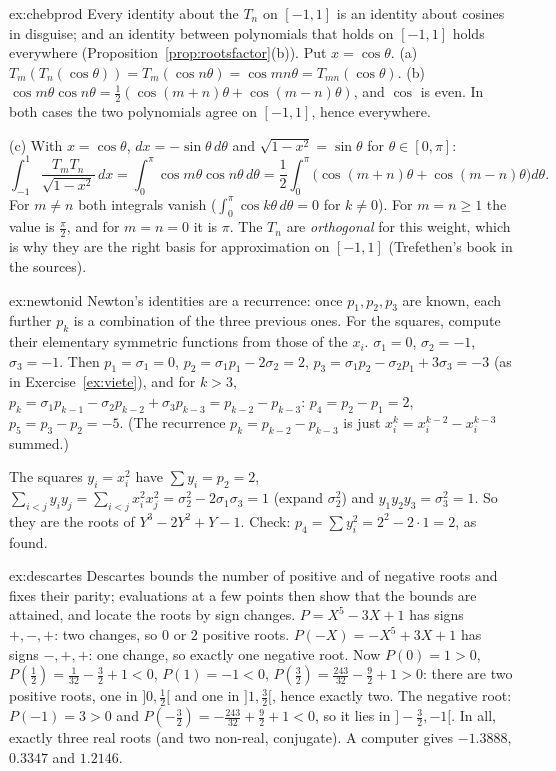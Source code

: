 \begin{solution}{ex:chebprod}
\idea Every identity about the $T_n$ on $[-1,1]$ is an identity about cosines in disguise; and an identity between polynomials that holds on $[-1,1]$ holds everywhere (Proposition~\ref{prop:rootsfactor}(b)).
\writeup Put $x=\cos\theta$. (a) $T_m(T_n(\cos\theta))=T_m(\cos n\theta)=\cos mn\theta=T_{mn}(\cos\theta)$. (b) $\cos m\theta\cos n\theta=\frac12(\cos(m+n)\theta+\cos(m-n)\theta)$, and $\cos$ is even. In both cases the two polynomials agree on $[-1,1]$, hence everywhere.

(c) With $x=\cos\theta$, $dx=-\sin\theta\,d\theta$ and $\sqrt{1-x^2}=\sin\theta$ for $\theta\in[0,\pi]$:
\[
\int_{-1}^1\frac{T_mT_n}{\sqrt{1-x^2}}\,dx=\int_0^\pi\cos m\theta\cos n\theta\,d\theta=\frac12\int_0^\pi\bigl(\cos(m+n)\theta+\cos(m-n)\theta\bigr)d\theta.
\]
For $m\ne n$ both integrals vanish ($\int_0^\pi\cos k\theta\,d\theta=0$ for $k\ne0$). For $m=n\ge1$ the value is $\frac\pi2$, and for $m=n=0$ it is $\pi$.
The $T_n$ are \emph{orthogonal} for this weight, which is why they are the right basis for approximation on $[-1,1]$ (Trefethen's book in the sources).
\end{solution}

\begin{solution}{ex:newtonid}
\idea Newton's identities are a recurrence: once $p_1,p_2,p_3$ are known, each further $p_k$ is a combination of the three previous ones. For the squares, compute their elementary symmetric functions from those of the $x_i$.
\writeup $\sigma_1=0$, $\sigma_2=-1$, $\sigma_3=-1$. Then $p_1=\sigma_1=0$, $p_2=\sigma_1p_1-2\sigma_2=2$, $p_3=\sigma_1p_2-\sigma_2p_1+3\sigma_3=-3$ (as in Exercise~\ref{ex:viete}), and for $k>3$, $p_k=\sigma_1p_{k-1}-\sigma_2p_{k-2}+\sigma_3p_{k-3}=p_{k-2}-p_{k-3}$:
$p_4=p_2-p_1=2$, $p_5=p_3-p_2=-5$. (The recurrence $p_k=p_{k-2}-p_{k-3}$ is just $x_i^k=x_i^{k-2}-x_i^{k-3}$ summed.)

The squares $y_i=x_i^2$ have $\sum y_i=p_2=2$, $\sum_{i<j}y_iy_j=\sum_{i<j}x_i^2x_j^2=\sigma_2^2-2\sigma_1\sigma_3=1$ (expand $\sigma_2^2$) and $y_1y_2y_3=\sigma_3^2=1$. So they are the roots of $Y^3-2Y^2+Y-1$. Check: $p_4=\sum y_i^2=2^2-2\cdot1=2$, as found.
\end{solution}

\begin{solution}{ex:descartes}
\idea Descartes bounds the number of positive and of negative roots and fixes their parity; evaluations at a few points then show that the bounds are attained, and locate the roots by sign changes.
\writeup $P=X^5-3X+1$ has signs $+,-,+$: two changes, so $0$ or $2$ positive roots. $P(-X)=-X^5+3X+1$ has signs $-,+,+$: one change, so exactly one negative root. Now $P(0)=1>0$, $P(\frac12)=\frac1{32}-\frac32+1<0$, $P(1)=-1<0$, $P(\frac32)=\frac{243}{32}-\frac92+1>0$: there are two positive roots, one in $]0,\frac12[$ and one in $]1,\frac32[$, hence exactly two. The negative root: $P(-1)=3>0$ and $P(-\frac32)=-\frac{243}{32}+\frac92+1<0$, so it lies in $]-\frac32,-1[$. In all, exactly three real roots (and two non-real, conjugate). A computer gives $-1.3888$, $0.3347$ and $1.2146$.
\end{solution}


